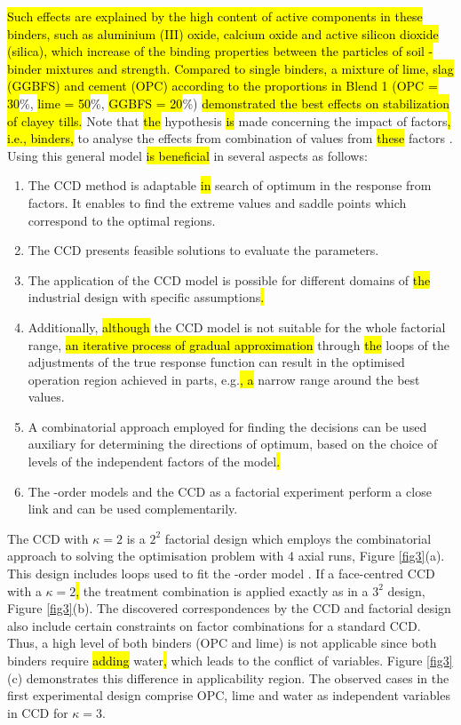 \documentclass[eprint,
]{actapoly}
\begin{document}
\hl{Such effects are explained by the high content of active components in these binders, such as aluminium (III) oxide, calcium oxide and active silicon dioxide (silica), which increase of the binding properties between the particles of soil -binder mixtures and strength. Compared to single binders, a mixture of lime, slag (GGBFS) and cement (OPC) according to the proportions in Blend 1 (OPC = 30}\%, \hl{lime = 50}\%, \hl{GGBFS = 20}\%) \hl{demonstrated the best effects on stabilization of clayey tills. }Note that \hl{the }hypothesis \hl{is }made concerning the impact of factors\hl{, i.e., binders, }to analyse the effects from combination\hl{ }of\hl{ }values from \hl{these }factors \cite{StatSoft}. Using this general model\hl{ is beneficial }in several aspects as follows:

\begin{enumerate}
	\item The CCD method is adaptable\hl{ in }search of optimum in the response from factors. It enables to find the extreme values and saddle points which correspond to the optimal regions.
	\item The CCD presents\hl{ }feasible solutions to evaluate the parameters.
	\item The application\hl{ }of the CCD model is possible for different domains of\hl{ the }industrial design with specific assumptions\hl{.}
	\item Additionally,\hl{ although }the CCD model is not suitable for the whole factorial range,\hl{ an iterative process of gradual approximation }through \hl{the }loops of the adjustments of the true response function can result in the optimised operation region achieved in parts, e.g.\hl{, a }narrow range around the best values.
	\item A combinatorial approach employed for finding the decisions can be used auxiliary for determining the directions of\hl{ }optimum, based on the choice of levels of the independent factors of the model\hl{.}
	\item The -order models and the CCD as a factorial experiment\hl{ }perform a close link and can be used complementarily. 
\end{enumerate}

The CCD with $\kappa=2$ is a $2^2$ factorial design which employs the combinatorial approach to solving the optimisation problem with 4 axial runs, Figure \ref{fig3}(a). This design includes loops used to fit the -order model \cite{Montgomery2019}. If a face-centred CCD with a $\kappa=2$\hl{, }the treatment combination is applied exactly as in a $3^2$ design, Figure \ref{fig3}(b). The discovered correspondences by the CCD and factorial design also include\hl{ }certain constraints on factor combinations for a standard CCD. Thus, a high level of both binders (OPC and lime) is not applicable since both binders require\hl{ adding }water\hl{, }which leads to the conflict of variables. Figure \ref{fig3}(c) demonstrates this difference in applicability region. The observed cases in the first experimental design comprise OPC, lime and water as independent variables in CCD for $\kappa=3$. 
\end{document}

